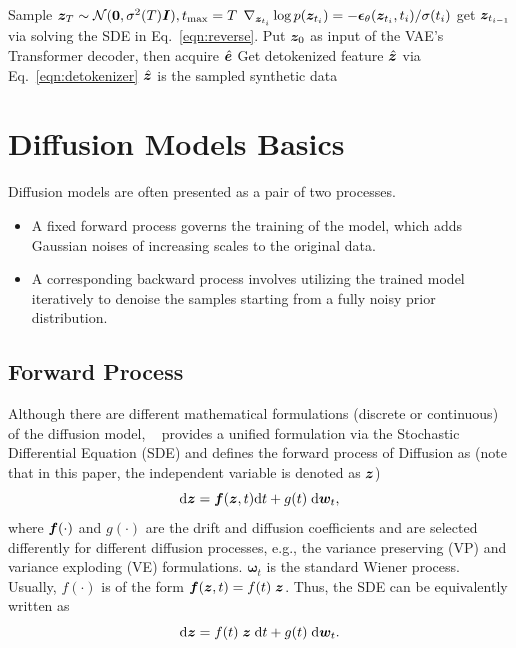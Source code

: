 \begin{algorithm}[H]
    \centering
    \caption{\modelname: Sampling}\label{algorithm:sampling}
    \begin{algorithmic}[1]
        \STATE Sample ${\bm{z}}_{{T}} \sim {\mathcal{N}}(\bm{0}, \sigma^2({T}){\bm{I}}), t_{\rm max} = T$
        \STATE $\nabla_{{\bm{z}}_{t_i}}\log p({\bm{z}}_{t_i}) = -\bm{\epsilon}_{\theta}({\bm{z}}_{t_i}, {t_i}) / \sigma({t_i})$
        \STATE get ${\bm{z}}_{t_{i-1}}$ via solving the SDE in Eq.~\ref{eqn:reverse}.
        \ENDFOR
        \STATE Put ${\bm{z}}_0$ as input of the VAE's Transformer decoder, then acquire $\hat{{\bm{e}}}$
        \STATE Get detokenized feature $\hat{{\bm{z}}}$ via Eq.~\ref{eqn:detokenizer}
        \STATE $\hat{{\bm{z}}}$ is the sampled synthetic data
    \end{algorithmic}
\end{algorithm}

\section{Diffusion Models Basics}\label{appendix:diffusion}
Diffusion models are often presented as a pair of two processes. 
\begin{itemize}
    \item A fixed forward process governs the training of the model, which adds Gaussian noises of increasing scales to the original data.
    \item A corresponding backward process involves utilizing the trained model iteratively to denoise the samples starting from a fully noisy prior distribution.
\end{itemize}

\subsection{Forward Process}
Although there are different mathematical formulations (discrete or continuous) of the diffusion model, ~\citet{vp} provides a unified formulation via the Stochastic Differential Equation (SDE) and defines the forward process of Diffusion as (note that in this paper, the independent variable is denoted as ${\bm{z}}$)
\begin{equation}\label{eqn:diffusion-forward}
    {\rm d} {\bm{z}} =  {\bm{f}}({\bm{z}}, t){\rm d}t + g(t) \; {\rm d} {\bm{w}}_t,
\end{equation}
where ${\bm{f}}(\cdot)$ and $g(\cdot)$ are the drift and diffusion coefficients and are selected differently for different diffusion processes, e.g., the variance preserving (VP) and variance exploding (VE) formulations. $\bm{\omega}_t$ is the standard Wiener process. Usually, $f(\cdot)$ is of the form ${\bm{f}}({\bm{z}}, t)  = f(t) \; {\bm{z}} $. Thus, the SDE can be equivalently written as
\begin{equation}
    {\rm d} {\bm{z}} = f(t)\; {\bm{z}} \; {\rm d}t + g(t) \; {\rm d}{\bm{w}}_t.
\end{equation}

